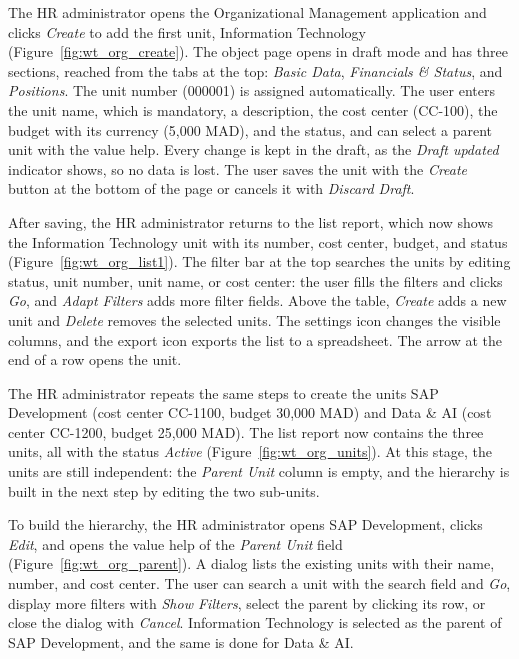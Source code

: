 
The HR administrator opens the Organizational Management application and clicks \emph{Create} to add the first unit, Information Technology (Figure~\ref{fig:wt_org_create}). The object page opens in draft mode and has three sections, reached from the tabs at the top: \emph{Basic Data}, \emph{Financials \& Status}, and \emph{Positions}. The unit number (000001) is assigned automatically. The user enters the unit name, which is mandatory, a description, the cost center (CC-100), the budget with its currency (5,000 MAD), and the status, and can select a parent unit with the value help. Every change is kept in the draft, as the \emph{Draft updated} indicator shows, so no data is lost. The user saves the unit with the \emph{Create} button at the bottom of the page or cancels it with \emph{Discard Draft}.


After saving, the HR administrator returns to the list report, which now shows the Information Technology unit with its number, cost center, budget, and status (Figure~\ref{fig:wt_org_list1}). The filter bar at the top searches the units by editing status, unit number, unit name, or cost center: the user fills the filters and clicks \emph{Go}, and \emph{Adapt Filters} adds more filter fields. Above the table, \emph{Create} adds a new unit and \emph{Delete} removes the selected units. The settings icon changes the visible columns, and the export icon exports the list to a spreadsheet. The arrow at the end of a row opens the unit.


The HR administrator repeats the same steps to create the units SAP Development (cost center CC-1100, budget 30,000 MAD) and Data \& AI (cost center CC-1200, budget 25,000 MAD). The list report now contains the three units, all with the status \emph{Active} (Figure~\ref{fig:wt_org_units}). At this stage, the units are still independent: the \emph{Parent Unit} column is empty, and the hierarchy is built in the next step by editing the two sub-units.


To build the hierarchy, the HR administrator opens SAP Development, clicks \emph{Edit}, and opens the value help of the \emph{Parent Unit} field (Figure~\ref{fig:wt_org_parent}). A dialog lists the existing units with their name, number, and cost center. The user can search a unit with the search field and \emph{Go}, display more filters with \emph{Show Filters}, select the parent by clicking its row, or close the dialog with \emph{Cancel}. Information Technology is selected as the parent of SAP Development, and the same is done for Data \& AI.

